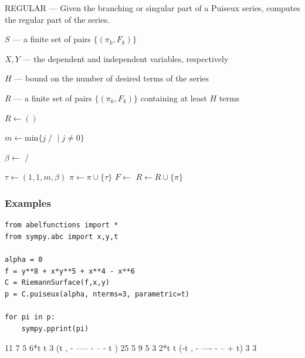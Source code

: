 \documentclass[10pt,twoside]{article}
\newcommand{\Input}{\Require}
\newcommand{\Output}{\Ensure}
\newcommand{\ForEach}{\ForAll}
\theoremstyle{plain}
\theoremstyle{definition}
\numberwithin{equation}{section}
\begin{document}
\begin{algorithm}[h]
\caption{REGULAR --- Given the branching or singular part of a Puiseux
  series, computes the regular part of the series.}
\label{alg: puiseux-regular}
\begin{algorithmic}[1]
\Input

$S$ --- a finite set of pairs $\{(\pi_k,F_k)\}$

$X,Y$ --- the dependent and independent variables, respectively

$H$ --- bound on the number of desired terms of the series

\Output $R$ --- a finite set of pairs $\{(\pi_k,F_k)\}$ containing at
least $H$ terms

  \State $R \leftarrow ()$
  \ForEach{$(\pi,F)$ {\bf in} $S$}

      \State $m \leftarrow \text{min} \{ j \; /$
       $ \; | \; j \neq 0 \}$

      \State $\beta \leftarrow$  /

      \State $\tau \leftarrow (1,1,m,\beta)$
      \State $\pi \leftarrow \pi \cup \{\tau\}$
      \State $F \leftarrow$ 
    \EndWhile
    \State $R \leftarrow R \cup \{\pi\}$
  \EndFor
\EndFunction
\end{algorithmic}
\end{algorithm}

\subsubsection*{Examples}

\begin{lstlisting}
from abelfunctions import *
from sympy.abc import x,y,t

alpha = 0
f = y**8 + x*y**5 + x**4 - x**6
C = RiemannSurface(f,x,y)
p = C.puiseux(alpha, nterms=3, parametric=t)

for pi in p:
    sympy.pprint(pi)
\end{lstlisting}
\begin{pyoutput}
          11    7      
  5    6*t     t     3 
(t , - ----- - -- - t )
         25    5       
           9    5     
   3    2*t    t      
(-t , - ---- - -- + t)
         3     3      
\end{pyoutput}
\end{document}
